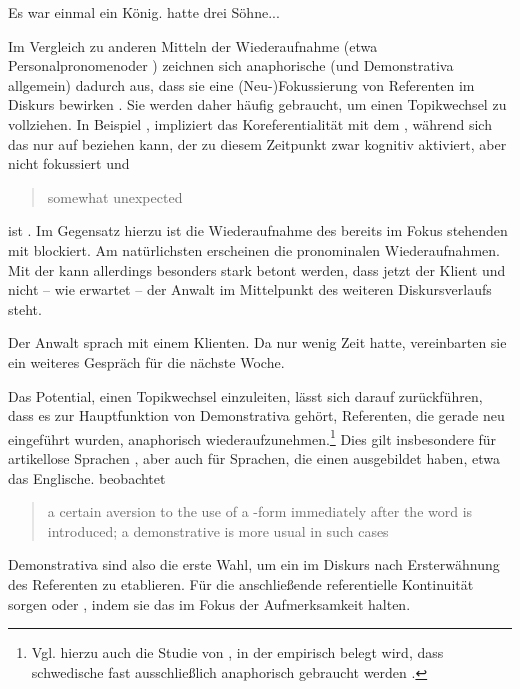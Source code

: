 \begin{exe}
	\ex \label{ex:anaph} Es war einmal ein König.  hatte drei Söhne...
\end{exe}

Im Vergleich zu anderen Mitteln der Wiederaufnahme   (etwa Personalpronomen\linebreak oder ) zeichnen sich anaphorische   (und Demonstrativa  allgemein) dadurch aus, dass sie eine (Neu-)Fokussierung von Referenten im Diskurs bewirken \parencite [s. u.a.][]{Ehlich1979,Prince1981,Gundel1993,Comrie1997,Himmelmann1996,Diessel1999,Kibrik2011}. Sie werden daher häufig gebraucht, um einen Topikwechsel   zu vollziehen. In Beispiel  \parencite[angelehnt an][96]{Diessel1999}, impliziert das   Koreferentialität  mit dem  , während sich das   nur auf  beziehen kann, der zu diesem Zeitpunkt zwar kognitiv aktiviert, aber nicht fokussiert und \blockcquote[96]{Diessel1999}{somewhat unexpected} ist \parencite[vgl. hierzu][278--279]{Gundel1993}. Im Gegensatz hierzu ist die Wiederaufnahme des bereits im Fokus stehenden  mit  blockiert. Am natürlichsten erscheinen die pronominalen  Wiederaufnahmen. Mit der   kann allerdings besonders stark betont werden, dass jetzt der Klient und nicht -- wie erwartet -- der Anwalt im Mittelpunkt des weiteren Diskursverlaufs steht.   

\begin{exe}
	\ex \label{ex:topic} Der Anwalt sprach mit einem Klienten. Da  nur wenig Zeit hatte, vereinbarten sie ein weiteres Gespräch für die nächste Woche. 
\end{exe}

Das Potential, einen Topikwechsel  einzuleiten, lässt sich darauf zurückführen, dass es zur Hauptfunktion von Demonstrativa  gehört, Referenten, die gerade neu eingeführt wurden, anaphorisch  wiederaufzunehmen.\footnote{Vgl. hierzu auch die Studie von \citeauthor{Fraurud1990}, in der empirisch belegt wird, dass schwedische  fast ausschließlich anaphorisch  gebraucht werden \parencite[400]{Fraurud1990}.} Dies gilt insbesondere für artikellose Sprachen  \parencite[229]{Himmelmann1996}, aber auch für Sprachen, die einen  ausgebildet haben, etwa das Englische. \citeauthor{Christophersen1939} beobachtet \blockcquote[vgl.][29]{Christophersen1939} {a certain aversion to the use of a -form immediately after the word is introduced; a demonstrative is more usual in such cases}. Demonstrativa  sind also die erste Wahl, um ein  im Diskurs nach Ersterwähnung des Referenten zu etablieren. Für die  anschließende referentielle Kontinuität  sorgen  oder , indem sie das  im Fokus der Aufmerksamkeit halten. 

